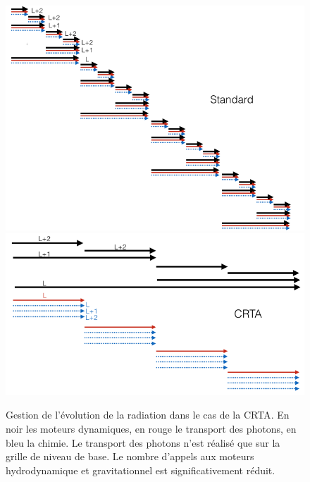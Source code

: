 \begin{figure}
\includegraphics[width=.95\linewidth]{img/02/revz_crad_std.png}
\includegraphics[width=.95\linewidth]{img/02/revz_crad.png}
\caption[CRTA]{Gestion de l'évolution de la radiation dans le cas de la \ac{CRTA}.
En noir les moteurs dynamiques, en rouge le transport des photons, en bleu la chimie.
Le transport des photons n'est réalisé que sur la grille de niveau de base.
Le nombre d'appels aux moteurs hydrodynamique et gravitationnel est significativement réduit. 
\label{fig:CRTA}}
\end{figure}


